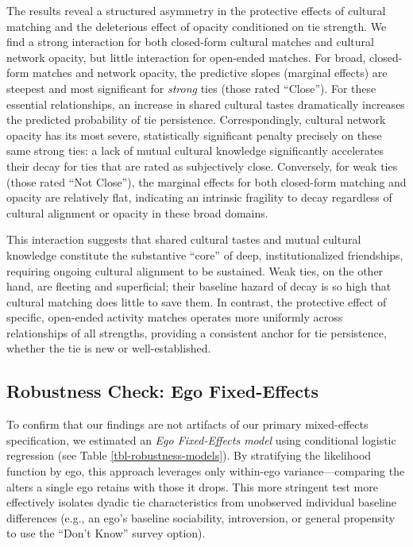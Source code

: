 \documentclass[
  letterpaper,
  DIV=11,
  numbers=noendperiod]{scrartcl}
\begin{document}
The results reveal a structured asymmetry in the protective effects of cultural matching and the deleterious effect of opacity conditioned on tie strength. We find a strong interaction for both closed-form cultural matches and cultural network opacity, but little interaction for open-ended matches. For broad, closed-form matches and network opacity, the predictive slopes (marginal effects) are steepest and most significant for \textit{strong} ties (those rated ``Close''). For these essential relationships, an increase in shared cultural tastes dramatically increases the predicted probability of tie persistence. Correspondingly, cultural network opacity has its most severe, statistically significant penalty precisely on these same strong ties: a lack of mutual cultural knowledge significantly accelerates their decay for ties that are rated as subjectively close. Conversely, for weak ties (those rated ``Not Close''), the marginal effects for both closed-form matching and opacity are relatively flat, indicating an intrinsic fragility to decay regardless of cultural alignment or opacity in these broad domains.

This interaction suggests that shared cultural tastes and mutual cultural knowledge constitute the substantive ``core'' of deep, institutionalized friendships, requiring ongoing cultural alignment to be sustained. Weak ties, on the other hand, are fleeting and superficial; their baseline hazard of decay is so high that cultural matching does little to save them. In contrast, the protective effect of specific, open-ended activity matches operates more uniformly across relationships of all strengths, providing a consistent anchor for tie persistence, whether the tie is new or well-established.

\subsection{Robustness Check: Ego Fixed-Effects}

To confirm that our findings are not artifacts of our primary mixed-effects specification, we estimated an \textit{Ego Fixed-Effects model} using conditional logistic regression (see Table \ref{tbl-robustness-models}). By stratifying the likelihood function by ego, this approach leverages only within-ego variance—comparing the alters a single ego retains with those it drops. This more stringent test more effectively isolates dyadic tie characteristics from unobserved individual baseline differences (e.g., an ego's baseline sociability, introversion, or general propensity to use the ``Don't Know'' survey option). 
\end{document}
